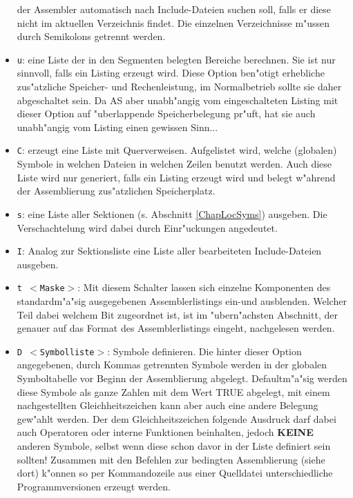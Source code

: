 \documentclass[12pt,a4paper,twoside]{report}
\newcommand{\bb}[1]{{\bf #1}}
\newcommand{\tty}[1]{{\tt #1}}
\begin{document}
\begin{itemize}
{      der Assembler automatisch nach Include-Dateien suchen soll, falls
      er diese nicht im aktuellen Verzeichnis findet. Die einzelnen
      Verzeichnisse m"ussen durch Semikolons getrennt werden.}
\item{\tty{u}: eine Liste der in den Segmenten belegten Bereiche berechnen.
      Sie ist nur sinnvoll, falls ein Listing erzeugt
      wird.  Diese Option ben"otigt erhebliche zus"atzliche Speicher-
      und Rechenleistung, im Normalbetrieb sollte sie daher abgeschaltet
      sein.  Da AS aber unabh"angig vom eingeschalteten Listing mit dieser
      Option auf "uberlappende Speicherbelegung pr"uft, hat sie auch
      unabh"angig vom Listing einen gewissen Sinn...}
\item{\tty{C}: erzeugt eine Liste mit Querverweisen.  Aufgelistet wird,
      welche (globalen) Symbole in welchen Dateien in welchen Zeilen
      benutzt werden.  Auch diese Liste wird nur generiert, falls
      ein Listing erzeugt wird und belegt w"ahrend der
      Assemblierung zus"atzlichen Speicherplatz.}
\item{\tty{s}: eine Liste aller Sektionen (s. Abschnitt \ref{ChapLocSyms})
      ausgeben.  Die Verschachtelung wird dabei durch Einr"uckungen
      angedeutet.}
\item{\tty{I}: Analog zur Sektionsliste eine Liste aller bearbeiteten
      Include-Dateien ausgeben.}
\item{\tty{t $<$Maske$>$}: Mit diesem Schalter lassen sich einzelne Komponenten
      des standardm"a"sig ausgegebenen Assemblerlistings ein-und ausblenden.
      Welcher Teil dabei welchem Bit zugeordnet ist, ist im "ubern"achsten
      Abschnitt, der genauer auf das Format des Assemblerlistings eingeht,
      nachgelesen werden.}
\item{\tty{D $<$Symbolliste$>$}: Symbole definieren. Die hinter dieser Option
      angegebenen, durch Kommas getrennten Symbole werden in der
      globalen Symboltabelle vor Beginn der Assemblierung abgelegt.
      Defaultm"a"sig werden diese Symbole als ganze Zahlen mit dem
      Wert TRUE abgelegt, mit einem nachgestellten Gleichheitszeichen
      kann aber auch eine andere Belegung gew"ahlt werden.  Der dem
      Gleichheitszeichen folgende Ausdruck darf dabei auch Operatoren
      oder interne Funktionen beinhalten, jedoch \bb{KEINE} anderen
      Symbole, selbst wenn diese schon davor in der Liste definiert
      sein sollten!  Zusammen mit den Befehlen zur bedingten
      Assemblierung (siehe dort) k"onnen so per Kommandozeile aus einer
      Quelldatei unterschiedliche Programmversionen erzeugt werden.
}
\end{itemize}
\end{document}
